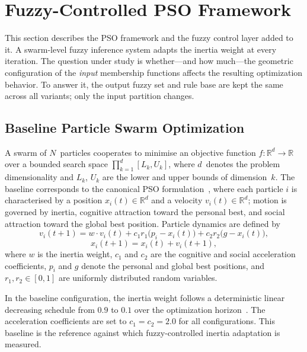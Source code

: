 \documentclass[conference]{IEEEtran}
\begin{document}
\section{Fuzzy-Controlled PSO Framework}
\label{sec:framework}

This section describes the PSO framework and the fuzzy control layer added to it. A swarm-level fuzzy inference system adapts the inertia weight at every iteration. The question under study is whether---and how much---the geometric configuration of the \emph{input} membership functions affects the resulting optimization behavior. To answer it, the output fuzzy set and rule base are kept the same across all variants; only the input partition changes.

\subsection{Baseline Particle Swarm Optimization}
\label{subsec:baseline_pso}

A swarm of $N$~particles cooperates to minimise an objective function $f\colon\mathbb{R}^d\to\mathbb{R}$ over a bounded search space $\prod_{k=1}^{d}[L_k, U_k]$, where $d$~denotes the problem dimensionality and $L_k$, $U_k$ are the lower and upper bounds of dimension~$k$. The baseline corresponds to the canonical PSO formulation~\cite{kennedy1995particle, shi1998modified}, where each particle $i$ is characterised by a position $x_i(t)\in\mathbb{R}^d$ and a velocity $v_i(t)\in\mathbb{R}^d$; motion is governed by inertia, cognitive attraction toward the personal best, and social attraction toward the global best position. Particle dynamics are defined by
\begin{equation}
    v_i(t{+}1) = w \cdot v_i(t) + c_1 r_1 \bigl(p_i - x_i(t)\bigr) + c_2 r_2 \bigl(g - x_i(t)\bigr),
    \label{eq:pso_velocity}
\end{equation}
\begin{equation}
    x_i(t{+}1) = x_i(t) + v_i(t{+}1),
    \label{eq:pso_position}
\end{equation}
where $w$ is the inertia weight, $c_1$ and $c_2$ are the cognitive and social acceleration coefficients, $p_i$ and $g$ denote the personal and global best positions, and $r_1, r_2 \in [0,1]$ are uniformly distributed random variables.

In the baseline configuration, the inertia weight follows a deterministic linear decreasing schedule from $0.9$ to $0.1$ over the optimization horizon~\cite{abualigah2021arithmetic}. The acceleration coefficients are set to $c_1 = c_2 = 2.0$ for all configurations. This baseline is the reference against which fuzzy-controlled inertia adaptation is measured.
\end{document}

